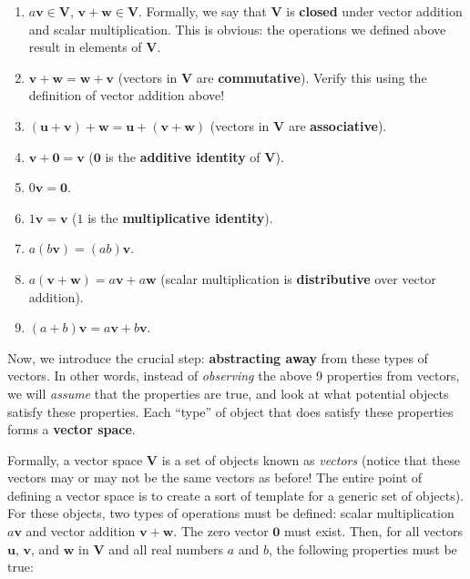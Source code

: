 \documentclass{article}
\begin{document}
\begin{enumerate}
    \item $a\mathbf{v}\in\mathbf{V}$, $\mathbf{v}+\mathbf{w}\in\mathbf{V}$. Formally, we say that $\mathbf{V}$ is \textbf{closed} under vector addition and scalar multiplication. This is obvious: the operations we defined above result in elements of $\mathbf{V}$.
    \item $\mathbf{v}+\mathbf{w}=\mathbf{w}+\mathbf{v}$ (vectors in $\mathbf{V}$ are \textbf{commutative}). Verify this using the definition of vector addition above!
    \item $(\mathbf{u}+\mathbf{v})+\mathbf{w}=\mathbf{u}+(\mathbf{v}+\mathbf{w})$ (vectors in $\mathbf{V}$ are \textbf{associative}).
    \item $\mathbf{v}+\mathbf{0}=\mathbf{v}$ ($\mathbf{0}$ is the \textbf{additive identity} of $\mathbf{V}$).
    \item $0\mathbf{v}=\mathbf{0}$.
    \item $1\mathbf{v}=\mathbf{v}$ ($1$ is the \textbf{multiplicative identity}).
    \item $a(b\mathbf{v})=(ab)\mathbf{v}$.
    \item $a(\mathbf{v}+\mathbf{w})=a\mathbf{v}+a\mathbf{w}$ (scalar multiplication is \textbf{distributive} over vector addition).
    \item $(a+b)\mathbf{v}=a\mathbf{v}+b\mathbf{v}$.
\end{enumerate}

Now, we introduce the crucial step: \textbf{abstracting away} from these types of vectors. In other words, instead of \textit{observing} the above 9 properties from vectors, we will \textit{assume} that the properties are true, and look at what potential objects satisfy these properties. Each ``type'' of object that does satisfy these properties forms a \textbf{vector space}.

Formally, a vector space $\mathbf{V}$ is a set of objects known as \textit{vectors} (notice that these vectors may or may not be the same vectors as before! The entire point of defining a vector space is to create a sort of template for a generic set of objects). For these objects, two types of operations must be defined: scalar multiplication $a\mathbf{v}$ and vector addition $\mathbf{v}+\mathbf{w}$. The zero vector $\mathbf{0}$ must exist. Then, for all vectors $\mathbf{u}$, $\mathbf{v}$, and $\mathbf{w}$ in $\mathbf{V}$ and all real numbers $a$ and $b$, the following properties must be true:
\end{document}
